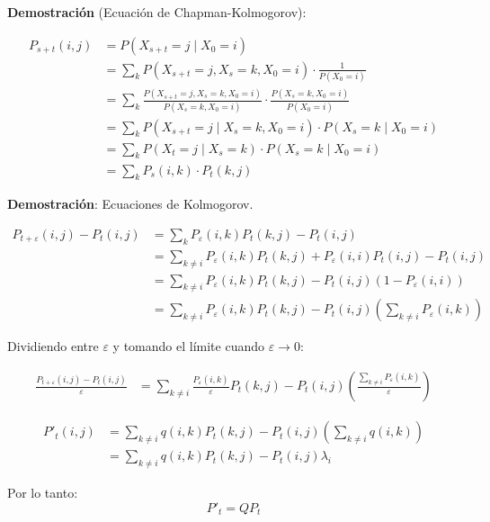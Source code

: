 \documentclass[12pt,a4paper]{article}
\begin{document}
\textbf{Demostración} (Ecuación de Chapman-Kolmogorov):

\begin{align*}
P_{s+t}(i,j) &= P(X_{s+t} = j \mid X_0 = i) \\
&= \sum_{k} P(X_{s+t} = j, X_s = k, X_0 = i) \cdot \frac{1}{P(X_0 = i)} \\
&= \sum_{k} \frac{P(X_{s+t} = j, X_s = k, X_0 = i)}{P(X_s = k, X_0 = i)} \cdot \frac{P(X_s = k, X_0 = i)}{P(X_0 = i)} \\
&= \sum_{k} P(X_{s+t} = j \mid X_s = k, X_0 = i) \cdot P(X_s = k \mid X_0 = i) \\
&= \sum_{k} P(X_t = j \mid X_s = k) \cdot P(X_s = k \mid X_0 = i) \\
&= \sum_{k} P_s(i,k) \cdot P_t(k,j)
\end{align*}


\textbf{Demostración}: Ecuaciones de Kolmogorov.

\begin{align*}
P_{t+\varepsilon}(i,j) - P_t(i,j) &= \sum_{k} P_\varepsilon(i,k) P_t(k,j) - P_t(i,j) \\
&= \sum_{k \neq i} P_\varepsilon(i,k) P_t(k,j) + P_\varepsilon(i,i) P_t(i,j) - P_t(i,j) \\
&= \sum_{k \neq i} P_\varepsilon(i,k) P_t(k,j) - P_t(i,j)(1 - P_\varepsilon(i,i)) \\
&= \sum_{k \neq i} P_\varepsilon(i,k) P_t(k,j) - P_t(i,j) \left(\sum_{k \neq i} P_\varepsilon(i,k)\right)
\end{align*}

Dividiendo entre $\varepsilon$ y tomando el límite cuando $\varepsilon \to 0$:

\begin{align*}
\frac{P_{t+\varepsilon}(i,j) - P_t(i,j)}{\varepsilon} &= \sum_{k \neq i} \frac{P_\varepsilon(i,k)}{\varepsilon} P_t(k,j) - P_t(i,j) \left(\frac{\sum_{k \neq i} P_\varepsilon(i,k)}{\varepsilon}\right)
\end{align*}

\begin{align*}
P'_t(i,j) &= \sum_{k \neq i} q(i,k) P_t(k,j) - P_t(i,j) \left(\sum_{k \neq i} q(i,k)\right) \\
&= \sum_{k \neq i} q(i,k) P_t(k,j) - P_t(i,j) \lambda_i
\end{align*}

Por lo tanto:
\begin{equation*}
P'_t = Q P_t
\end{equation*}
\end{document}
